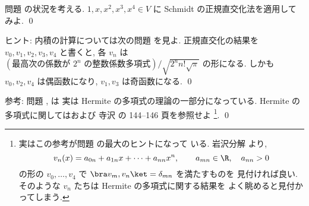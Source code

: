 \documentclass[12pt,twoside]{jarticle}
\begin{document}

\begin{question}
\label{q:Hermite-polyn-2}
  問題  の状況を考える. 
  $1,x,x^2,x^3,x^4\in V$ に Schmidt の正規直交化法を適用してみよ.
  \qed
\end{question}

\noindent
ヒント: 内積の計算については次の問題  を見よ.
正規直交化の結果を $v_0,v_1,v_2,v_3,v_4$ と書くと, 
各 $v_n$ は $(\text{最高次の係数が $2^n$ の整数係数多項式})\big/
\sqrt{2^nn!\sqrt{\pi}}$ の形になる.
しかも $v_0,v_2,v_4$ は偶函数になり, $v_1,v_3$ は奇函数になる.
\qed

\medskip
\noindent
参考: 問題 ,  は
実は Hermite の多項式の理論の一部分になっている.  
Hermite の多項式に関してはおよび
寺沢 \cite{terakan} の 144--146 頁を参照せよ%
\footnote{実はこの参考が問題  の最大のヒントになって
  いる. 岩沢分解  より,
  \begin{equation*}
    v_n(x)=a_{0n}+a_{1n}x+\cdots+a_{nn}x^n,
    \qquad a_{mn}\in\R, \quad a_{nn}>0
  \end{equation*}
  の形の $v_0,\dots,v_4$ で $\bra v_m,v_n\ket = \delta_{mn}$ を満たすものを
  見付ければ良い. そのような $v_n$ たちは Hermite の多項式に関する結果を
  よく眺めると見付かってしまう.}.
\qed
\end{document}
